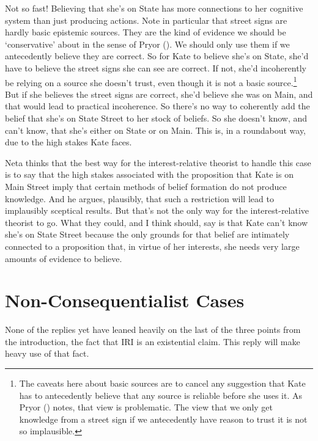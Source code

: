 \documentclass[
  11pt,
  letterpaper,
  DIV=11,
  numbers=noendperiod,
  twoside]{scrartcl}
\begin{document}
Not so fast! Believing that she's on State has more connections to her
cognitive system than just producing actions. Note in particular that
street signs are hardly basic epistemic sources. They are the kind of
evidence we should be `conservative' about in the sense of Pryor
(). We should only use them if we
antecedently believe they are correct. So for Kate to believe she's on
State, she'd have to believe the street signs she can see are correct.
If not, she'd incoherently be relying on a source she doesn't trust,
even though it is not a basic source.\footnote{The caveats here about
  basic sources are to cancel any suggestion that Kate has to
  antecedently believe that any source is reliable before she uses it.
  As Pryor () notes, that view is
  problematic. The view that we only get knowledge from a street sign if
  we antecedently have reason to trust it is not so implausible.} But if
she believes the street signs are correct, she'd believe she was on
Main, and that would lead to practical incoherence. So there's no way to
coherently add the belief that she's on State Street to her stock of
beliefs. So she doesn't know, and can't know, that she's either on State
or on Main. This is, in a roundabout way, due to the high stakes Kate
faces.

Neta thinks that the best way for the interest-relative theorist to
handle this case is to say that the high stakes associated with the
proposition that Kate is on Main Street imply that certain methods of
belief formation do not produce knowledge. And he argues, plausibly,
that such a restriction will lead to implausibly sceptical results. But
that's not the only way for the interest-relative theorist to go. What
they could, and I think should, say is that Kate can't know she's on
State Street because the only grounds for that belief are intimately
connected to a proposition that, in virtue of her interests, she needs
very large amounts of evidence to believe.

\section{Non-Consequentialist Cases}\label{non-consequentialist-cases}

None of the replies yet have leaned heavily on the last of the three
points from the introduction, the fact that IRI is an existential claim.
This reply will make heavy use of that fact.
\end{document}
